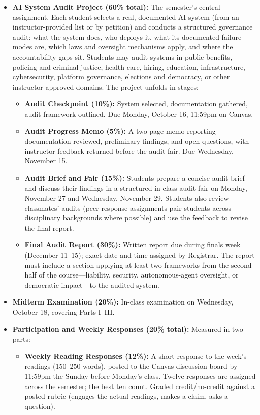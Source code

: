 \documentclass[12pt]{article}
\begin{document}
\begin{itemize}
    \item \textbf{AI System Audit Project (60\% total):} The semester's central assignment. Each student selects a real, documented AI system (from an instructor-provided list or by petition) and conducts a structured governance audit: what the system does, who deploys it, what its documented failure modes are, which laws and oversight mechanisms apply, and where the accountability gaps sit. Students may audit systems in public benefits, policing and criminal justice, health care, hiring, education, infrastructure, cybersecurity, platform governance, elections and democracy, or other instructor-approved domains. The project unfolds in stages:
    \begin{itemize}
        \item \textbf{Audit Checkpoint (10\%):} System selected, documentation gathered, audit framework outlined. Due Monday, October 16, 11:59pm on Canvas.
        \item \textbf{Audit Progress Memo (5\%):} A two-page memo reporting documentation reviewed, preliminary findings, and open questions, with instructor feedback returned before the audit fair. Due Wednesday, November 15.
        \item \textbf{Audit Brief and Fair (15\%):} Students prepare a concise audit brief and discuss their findings in a structured in-class audit fair on Monday, November 27 and Wednesday, November 29. Students also review classmates' audits (peer-response assignments pair students across disciplinary backgrounds where possible) and use the feedback to revise the final report.
        \item \textbf{Final Audit Report (30\%):} Written report due during finals week (December 11--15); exact date and time assigned by Registrar. The report must include a section applying at least two frameworks from the second half of the course---liability, security, autonomous-agent oversight, or democratic impact---to the audited system.
    \end{itemize}
    \item \textbf{Midterm Examination (20\%):} In-class examination on Wednesday, October 18, covering Parts I--III.
    \item \textbf{Participation and Weekly Responses (20\% total):} Measured in two parts:
    \begin{itemize}
        \item \textbf{Weekly Reading Responses (12\%):} A short response to the week's readings (150--250 words), posted to the Canvas discussion board by 11:59pm the Sunday before Monday's class. Twelve responses are assigned across the semester; the best ten count. Graded credit/no-credit against a posted rubric (engages the actual readings, makes a claim, asks a question).

\end{itemize}
\end{itemize}
\end{document}
